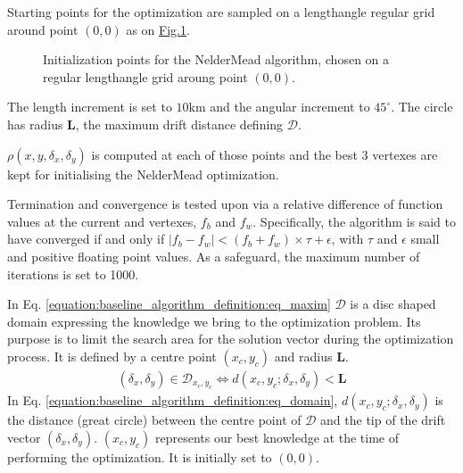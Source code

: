 \documentclass[letterpaper,10pt,english]{jupyterBook}
\begin{document}
\sphinxAtStartPar
Starting points for the optimization are sampled on a length\sphinxhyphen{}angle regular grid around point \((0,0)\) as on \hyperref[\detokenize{baseline_algorithm_definition:fig-startpoints}]{Fig.\@ \ref{\detokenize{baseline_algorithm_definition:fig-startpoints}}}.

\begin{figure}[htbp]
\centering
\capstart

\noindent{}
\caption{Initialization points for the Nelder\sphinxhyphen{}Mead algorithm, chosen on a regular length\sphinxhyphen{}angle grid aroung point \((0,0)\).}\label{\detokenize{baseline_algorithm_definition:fig-startpoints}}\end{figure}

\sphinxAtStartPar
The length increment is set to \(10\)km and the angular increment to
\(45^{\circ}\). The circle has radius \(\mathbf{L}\), the maximum drift
distance defining \(\mathcal{D}\).

\sphinxAtStartPar
\(\rho(x,y,\delta_x,\delta_y)\) is computed at each of those points and the best 3 vertexes are kept for initialising the Nelder\sphinxhyphen{}Mead
optimization.

\sphinxAtStartPar
Termination and convergence is tested upon via a relative difference of function values at the current  and  vertexes, \(f_b\) and
\(f_w\). Specifically, the algorithm is said to have converged if and only if \(| f_b - f_w | < (f_b + f_w) \times \tau + \epsilon\), with \(\tau\) and
\(\epsilon\) small and positive floating point values. As a safeguard, the maximum number of iterations is set to 1000.

\sphinxAtStartPar
In Eq. \eqref{equation:baseline_algorithm_definition:eq_maxim} \(\mathcal{D}\) is a disc shaped domain expressing the 
knowledge we bring to the optimization problem. Its purpose is to limit
the search area for the solution vector during the optimization process. It is defined by a centre point \((x_c,y_c)\) and radius \(\mathbf{L}\).
\begin{equation}\label{equation:baseline_algorithm_definition:eq_domain}
\begin{split}
(\delta_x,\delta_y) \in \mathcal{D}_{x_c,y_c} \Leftrightarrow d(x_c,y_c;\delta_x,\delta_y) < \mathbf{L}
\end{split}
\end{equation}
\sphinxAtStartPar
In Eq. \eqref{equation:baseline_algorithm_definition:eq_domain}, \(d(x_c,y_c;\delta_x,\delta_y)\) is the distance
(great circle) between the centre point of \(\mathcal{D}\) and
the tip of the drift vector \((\delta_x,\delta_y)\). \((x_c,y_c)\)
represents our best  knowledge at the time of performing the
optimization. It is initially set to \((0,0)\).
\end{document}

